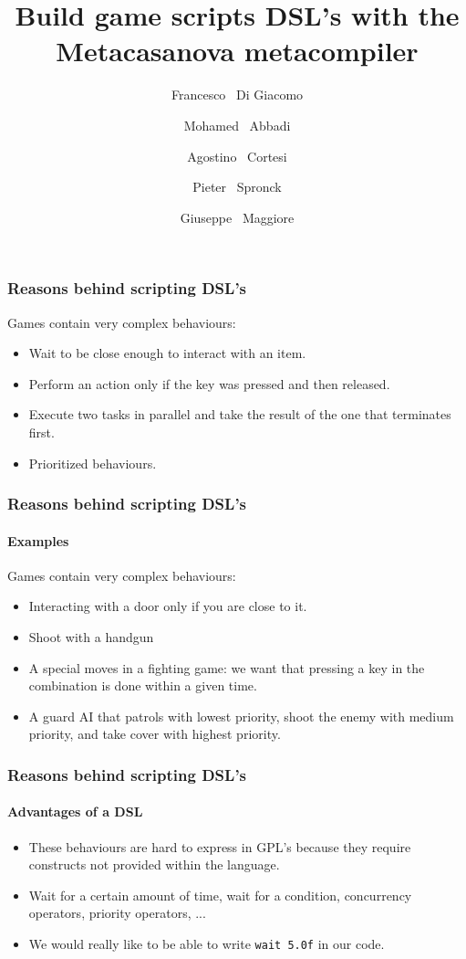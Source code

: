 \documentclass[10pt,a4paper]{beamer}
\begin{document}
\author[Di Giacomo et al.]
{Francesco ~Di Giacomo  \\
	\and Mohamed ~Abbadi  \\
	\and Agostino ~Cortesi  \\
	\and Pieter ~Spronck  \\
	\and Giuseppe ~Maggiore }
\date{}
\title{Build game scripts DSL's with the Metacasanova metacompiler}

\frame{\titlepage}

\begin{frame}
\frametitle{Reasons behind scripting DSL's}
Games contain very complex behaviours:
\begin{itemize}
\item Wait to be close enough to interact with an item.
\item Perform an action only if the key was pressed and then released.
\item Execute two tasks in parallel and take the result of the one that terminates first.
\item Prioritized behaviours.
\end{itemize}
\end{frame}

\begin{frame}
	\frametitle{Reasons behind scripting DSL's}
	\framesubtitle{Examples}
	Games contain very complex behaviours:
	\begin{itemize}
		\item Interacting with a door only if you are close to it.
		\item Shoot with a handgun
		\item A special moves in a fighting game: we want that pressing a key in the combination is done within a given time.
		\item A guard AI that patrols with lowest priority, shoot the enemy with medium priority, and take cover with highest priority.
	\end{itemize}
\end{frame}

\begin{frame}
	\frametitle{Reasons behind scripting DSL's}
	\framesubtitle{Advantages of a DSL}
	\begin{itemize}
		\item These behaviours are hard to express in GPL's because they require constructs not provided within the language.
		\item Wait for a certain amount of time, wait for a condition, concurrency operators, priority operators, ...
		\item We would really like to be able to write \texttt{wait 5.0f} in our code.
	\end{itemize}
\end{frame}
\end{document}
